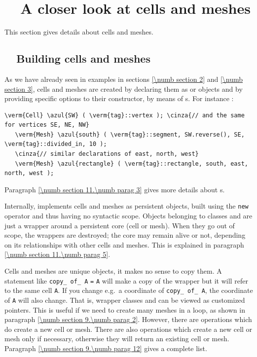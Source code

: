 
\chapter{~~A closer look at cells and meshes}\label{\numb section 9}


This section gives details about cells and meshes.

\section{~~Building cells and meshes}\label{\numb section 9.\numb parag 1}

As we have already seen in examples in sections \ref{\numb section 2} and \ref{\numb section 3},
cells and meshes are created by declaring them as {\small\tt {}} or
{\small\tt {}} objects
and by providing specific options to their constructor, by means of {\small\tt{}}s.
For instance :

\begin{Verbatim}[commandchars=\\\{\},formatcom=\small\tt,
   baselinestretch=0.94,framesep=2mm                      ]
   \verm{Cell} \azul{SW} ( \verm{tag}::vertex ); \cinza{// and the same for vertices SE, NE, NW}
   \verm{Mesh} \azul{south} ( \verm{tag}::segment, SW.reverse(), SE, \verm{tag}::divided_in, 10 );
   \cinza{// similar declarations of east, north, west}
   \verm{Mesh} \azul{rectangle} ( \verm{tag}::rectangle, south, east, north, west );
\end{Verbatim}

Paragraph \ref{\numb section 11.\numb parag 3} gives more details about {\small\tt{}}s.

Internally, {\maniFEM} implements cells and meshes as persistent objects, built
using the {\small\tt new} operator and thus having no syntactic scope.
Objects belonging to classes {\small\tt {}} and {\small\tt {}} are just a wrapper
around a persistent core (cell or mesh).
When they go out of scope, the wrappers are destroyed; the core may remain alive or not,
depending on its relationships with other cells and meshes.
This is explained in paragraph \ref{\numb section 11.\numb parag 5}.

Cells and meshes are unique objects, it makes no sense to copy them.
A statement like {\small\tt {}} {\small\tt copy\_\,of\_\,A} {\small\tt =} {\small\tt A}
will make a copy of the wrapper but it will refer to the same cell {\small\tt A}.
If you change e.g.\ a coordinate of {\small\tt copy\_\,of\_\,A}, the coordinate of {\small\tt A}
will also change.
That is, wrapper classes {\small\tt {}} and {\small\tt {}} can be viewed as
customized pointers.
This is useful if we need to create many meshes in a loop, as shown in paragraph
\ref{\numb section 9.\numb parag 2}.
However, there are operations which do create a new cell or mesh.
There are also operations which create a new cell or mesh only if necessary,
otherwise they will return an existing cell or mesh.
Paragraph \ref{\numb section 9.\numb parag 12} gives a complete list.

